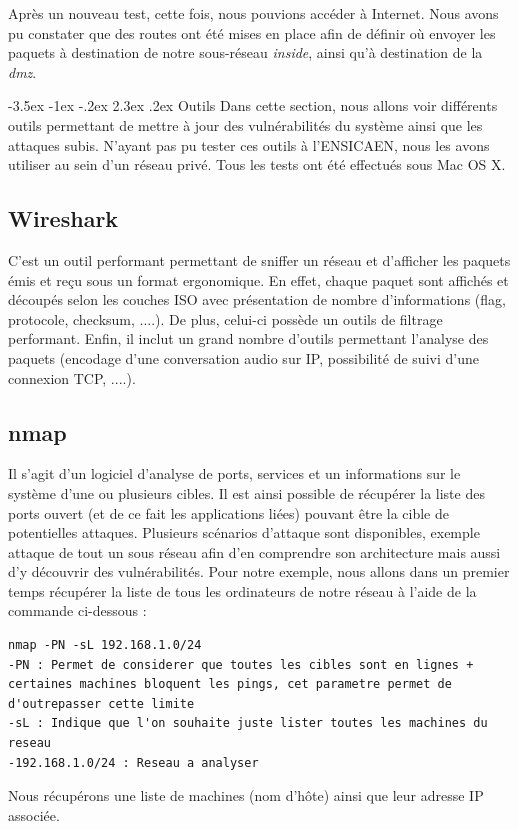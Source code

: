 \documentclass[a4paper,12pt]{article}
\makeatletter
\renewcommand\section{\@startsection {section}{1}{\z@}%
                           {-3.5ex \@plus -1ex \@minus -.2ex}%
                           {2.3ex \@plus.2ex}%
                           {\normalfont\Large\bfseries}}
\makeatother
\begin{document}
Après un nouveau test, cette fois, nous pouvions accéder à Internet. Nous avons pu constater que des routes ont été mises en place afin de définir où
envoyer les paquets à destination de notre sous-réseau \textit{inside}, ainsi qu'à destination de la \textit{dmz}.

\newpage
\section{Outils}
Dans cette section, nous allons voir différents outils permettant de mettre à jour des vulnérabilités du système ainsi que les attaques subis.
N'ayant pas pu tester ces outils à l'ENSICAEN, nous les avons utiliser au sein d'un réseau privé. Tous les tests ont été effectués sous Mac OS X.

\subsection{Wireshark}
C'est un outil performant permettant de sniffer un réseau et d'afficher les paquets émis et reçu sous un format ergonomique. En effet, chaque paquet 
sont affichés et découpés selon les couches ISO avec présentation de nombre d'informations (flag, protocole, checksum, ....). De plus, celui-ci possède 
un outils de filtrage performant. Enfin, il inclut un grand nombre d'outils permettant l'analyse des paquets (encodage d'une conversation audio sur IP, 
possibilité de suivi d'une connexion TCP, ....).

\subsection{nmap}
Il s'agit d'un logiciel d'analyse de ports, services et un informations sur le système d'une ou plusieurs cibles. Il est ainsi possible
de récupérer la liste des ports ouvert (et de ce fait les applications liées) pouvant être la cible de potentielles attaques. Plusieurs scénarios 
d'attaque sont disponibles, exemple attaque de tout un sous réseau afin d'en comprendre son architecture mais aussi d'y découvrir des vulnérabilités.
Pour notre exemple, nous allons dans un premier temps récupérer la liste de tous les ordinateurs de notre réseau à l'aide de la commande ci-dessous :
\begin{lstlisting}
nmap -PN -sL 192.168.1.0/24
-PN : Permet de considerer que toutes les cibles sont en lignes + certaines machines bloquent les pings, cet parametre permet de d'outrepasser cette limite
-sL : Indique que l'on souhaite juste lister toutes les machines du reseau
-192.168.1.0/24 : Reseau a analyser
\end{lstlisting}
Nous récupérons une liste de machines (nom d'hôte) ainsi que leur adresse IP associée.
\end{document}
